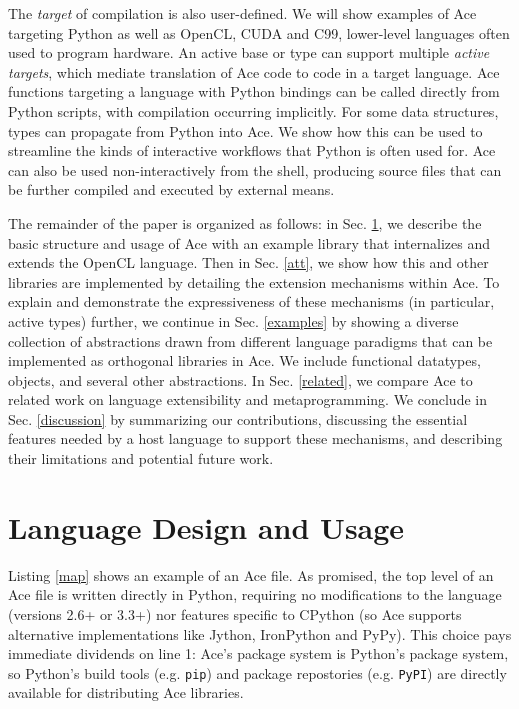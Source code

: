 \documentclass[9pt,preprint]{sigplanconf}
\begin{document}
The \emph{target} of compilation is also user-defined. We will show examples of Ace targeting Python as well as OpenCL, CUDA and C99, lower-level languages often used to program hardware. An active base or type can support multiple \emph{active targets}, which mediate translation of Ace code to code in a target language. Ace functions targeting a language with Python bindings can be called directly from Python scripts, with compilation occurring implicitly. For some data structures, types can propagate from Python into Ace. We show how this can be used to streamline the kinds of interactive workflows that Python is often used for. Ace can also be used non-interactively from the shell, producing source files that can be further compiled and executed by external means.

The remainder of the paper is organized as follows: in Sec. \ref{usage}, we describe the basic structure and usage of Ace with an example library that internalizes and extends the OpenCL language. Then in Sec. \ref{att}, we show how this and other libraries are implemented by detailing the extension mechanisms within Ace. To explain and demonstrate the expressiveness of these mechanisms (in particular, active types) further, we continue in Sec.  \ref{examples} by showing a diverse collection of abstractions drawn from different language paradigms that can be implemented as orthogonal libraries in Ace. We include functional datatypes, objects, and several other abstractions. In Sec.  \ref{related}, we compare Ace to related work on language extensibility and metaprogramming. We conclude in Sec. \ref{discussion} by summarizing our contributions, discussing the essential features needed by a host language to support these mechanisms, and describing their limitations and potential future work. 

\section{Language Design and Usage}\label{usage}
Listing \ref{map} shows an example of an Ace file. As promised, the top level of an Ace file is written directly in Python, requiring no modifications to the language (versions 2.6+ or 3.3+) nor features specific to CPython (so Ace supports alternative implementations like Jython, IronPython and PyPy). This choice pays immediate dividends on line 1: Ace's package system is Python's package system, so Python's build tools (e.g. \verb|pip|) and package repostories (e.g. \verb|PyPI|) are directly available for distributing Ace libraries. 
\end{document}
